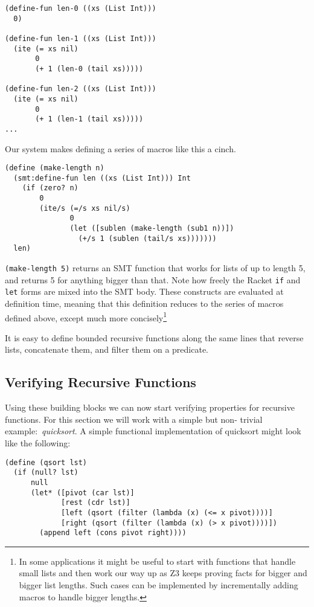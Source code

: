 \begin{verbatim}
(define-fun len-0 ((xs (List Int)))
  0)

(define-fun len-1 ((xs (List Int)))
  (ite (= xs nil)
       0
       (+ 1 (len-0 (tail xs)))))

(define-fun len-2 ((xs (List Int)))
  (ite (= xs nil)
       0
       (+ 1 (len-1 (tail xs)))))
...
\end{verbatim}

Our system makes defining a series of macros like this a cinch.

\begin{verbatim}
(define (make-length n)
  (smt:define-fun len ((xs (List Int))) Int
    (if (zero? n)
        0
        (ite/s (=/s xs nil/s)
               0
               (let ([sublen (make-length (sub1 n))])
                 (+/s 1 (sublen (tail/s xs)))))))
  len)
\end{verbatim}

\texttt{(make-length 5)} returns an SMT function that works for lists of up to
length 5, and returns 5 for anything bigger than that. Note how freely the
Racket \texttt{if} and \texttt{let} forms are mixed into the SMT body. These
constructs are evaluated at definition time, meaning that this definition
reduces to the series of macros defined above, except much more
concisely\footnote{In some applications it might be useful to start with
functions that handle small lists and then work our way up as Z3 keeps proving
facts for bigger and bigger list lengths. Such cases can be implemented by
incrementally adding macros to handle bigger lengths.}

It is easy to define bounded recursive functions along the same lines that
reverse lists, concatenate them, and filter them on a predicate.

\subsection{Verifying Recursive Functions}

Using these building blocks we can now start verifying properties for
recursive functions. For this section we will work with a simple but non-
trivial example:~\textit{quicksort}. A simple functional implementation of
quicksort might look like the following:

\begin{verbatim}
(define (qsort lst)
  (if (null? lst)
      null
      (let* ([pivot (car lst)]
             [rest (cdr lst)]
             [left (qsort (filter (lambda (x) (<= x pivot))))]
             [right (qsort (filter (lambda (x) (> x pivot))))])
        (append left (cons pivot right))))
\end{verbatim}

